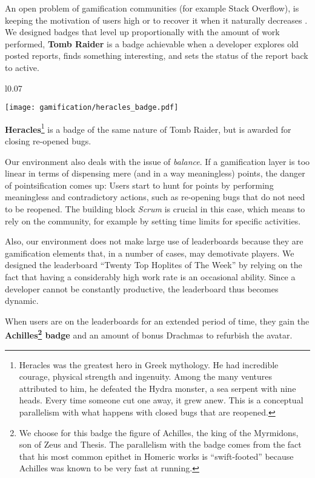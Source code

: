  An open problem of gamification communities (for example Stack Overflow), is keeping the motivation of users high or to recover it when it naturally decreases \cite{Grant2013}. We designed badges that level up proportionally with the amount of work performed, \eg \textbf{Tomb Raider} is a badge achievable when a developer explores old posted reports, finds something interesting, and sets the status of the report back to active.  

\noindent
\begin{wrapfigure}{l}{0.07\textwidth}
  \vspace{-18pt}
  \begin{center}
    \texttt{[image: gamification/heracles\_badge.pdf]}
  \end{center}
  \vspace{-30pt}
\end{wrapfigure}
\textbf{Heracles}\footnote{Heracles was the greatest hero in Greek mythology. He had incredible courage, physical strength and ingenuity. Among the many ventures attributed to him, he defeated the Hydra monster, a sea serpent with nine heads. Every time someone cut one away, it grew anew. This is a conceptual parallelism with what happens with closed bugs that are reopened.} is a badge of the same nature of Tomb Raider, but is awarded for closing re-opened bugs.

\pagebreak
Our environment also deals with the issue of {\em balance}. If a gamification layer is too linear in terms of dispensing mere (and in a way meaningless) points, the danger of pointsification comes up: Users start to hunt for points by performing meaningless and contradictory actions, such as re-opening bugs that do not need to be reopened. The building block {\em Scrum} is crucial in this case, which means to rely on the community, for example by setting time limits for specific activities.

Also, our environment does not make large use of leaderboards because they are gamification elements that, in a number of cases, may demotivate players. We designed the leaderboard ``Twenty Top Hoplites of The Week'' by relying on the fact that having a considerably high work rate is an occasional ability. Since a developer cannot be constantly productive, the leaderboard thus becomes dynamic.

 When users are on the leaderboards for an extended period of time, they gain the \textbf{Achilles\footnote{We choose for this badge the figure of Achilles, the king of the Myrmidons, son of Zeus and Thesis. The parallelism with the badge comes from the fact that his most common epithet in Homeric works is ``swift-footed'' because Achilles was known to be very fast at running.} badge} and an amount of bonus Drachmas to refurbish the avatar. 

